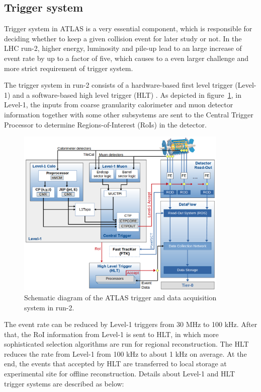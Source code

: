 \subsection{Trigger system}

Trigger system in ATLAS is a very essential component, which is responsible for deciding whether to keep a given collision event for later study or not.
In the LHC run-2, higher energy, luminosity and pile-up lead to an large increase of event rate by up to a factor of five, which causes to a even larger challenge and more strict requirement of trigger system.

The trigger system in run-2 consists of a hardware-based first level trigger (Level-1) and a software-based high level trigger (HLT) \cite{Ruiz-Martinez:2133909}.
As depicted in figure~\ref{fig:trig_syst}, in Level-1, the inputs from coarse granularity calorimeter and muon detector information together with some other subsystems are sent to the Central Trigger Processor to determine Regions-of-Interest (RoIs) in the detector. 
\begin{figure}[!htb]
  \centering
  \includegraphics[width=0.9\textwidth]{figures/Detector/tdaq-run2-schematic2017.png}
  \caption{Schematic diagram of the ATLAS trigger and data acquisition system in run-2.}
  \label{fig:trig_syst}
\end{figure}
The event rate can be reduced by Level-1 triggers from 30 MHz to 100 kHz. 
After that, the RoI information from Level-1 is sent to HLT, in which more sophisticated selection algorithms are run for regional reconstruction.
The HLT reduces the rate from Level-1 from 100 kHz to about 1 kHz on average.
At the end, the events that accepted by HLT are transferred to local storage at experimental site for offline reconstruction.
Details about Level-1 and HLT trigger systems are described as below:

